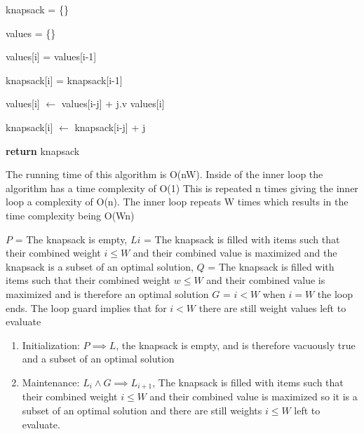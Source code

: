 \documentclass{article}
\begin{document}
\begin{enumerate}
\begin{algorithm}
\begin{algorithmic}[1]
      \State knapsack = \{\}

      \State values = \{\}


      	\State values[i] = values[i-1]

      	\State knapsack[i] = knapsack[i-1]



      			\State values[i] $\gets$ values[i-j] + j.v values[i]

      			\State knapsack[i] $\gets$ knapsack[i-j] + j

      		\EndIf

      	\EndFor

      \EndFor

      \State \textbf{return} knapsack

    \EndFunction

    \end{algorithmic}

\end{algorithm} 



The running time of this algorithm is O(nW). Inside of the inner loop the algorithm has a time complexity of O(1)
 This is repeated n times giving the inner loop a complexity of O(n). The inner loop repeats W times which results in the time complexity being O(Wn)


$P$ = The knapsack is empty, $Li$ = The knapsack is filled with items such that their combined weight $i \leq W$ and their combined value is maximized
 and the knapsack is a subset of an optimal solution, $Q$ = The knapsack is filled with items such that their combined weight $w \leq W$ and their combined value is maximized and is therefore an optimal solution
 $G$ = $i < W$ when $i = W$ the loop ends. The loop guard implies that for $i < W$ there are still weight values left to evaluate
    \begin{enumerate}

        \item Initialization: $P \implies L$, the knapsack is empty, and is therefore vacuously true and a subset of an optimal solution
        \item Maintenance: $L_{i} \land G \implies L_{i+1}$, The knapsack is filled with items such that their combined weight $i \leq W$ and their combined value is maximized so it is a subset of an optimal solution
 and there are still weights $i \leq W$ left to evaluate.


\end{enumerate}
\end{enumerate}
\end{document}
